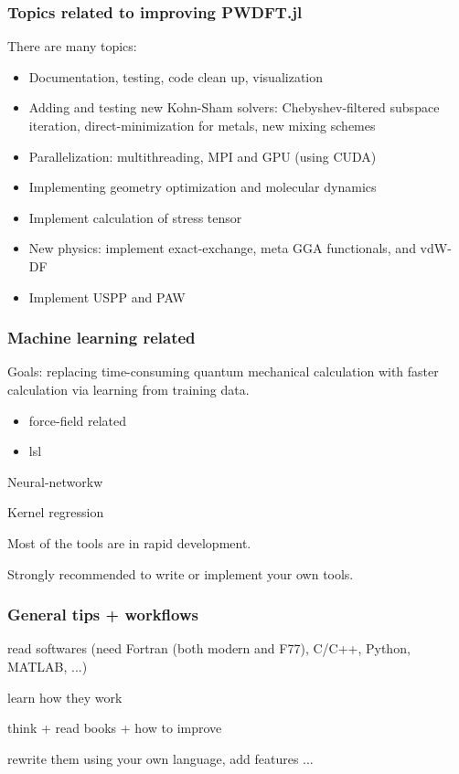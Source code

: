 \documentclass[english,9pt]{beamer}
\begin{document}
\begin{frame}
\frametitle{Topics related to improving PWDFT.jl}

There are many topics:

\begin{itemize}
\item Documentation, testing, code clean up, visualization
\item Adding and testing new Kohn-Sham solvers: Chebyshev-filtered
subspace iteration, direct-minimization for metals, new mixing schemes
\item Parallelization: multithreading, MPI and GPU (using CUDA)
\item Implementing geometry optimization and molecular dynamics
\item Implement calculation of stress tensor
\item New physics: implement exact-exchange, meta GGA functionals, and vdW-DF
\item Implement USPP and PAW
\end{itemize}


\end{frame}



\begin{frame}
\frametitle{Machine learning related}

Goals: replacing time-consuming quantum mechanical calculation with faster calculation
via learning from training data.

\begin{itemize}
\item force-field related
\item lsl
\end{itemize}

Neural-networkw

Kernel regression

Most of the tools are in rapid development.

Strongly recommended to write or implement your own tools.

\end{frame}


\begin{frame}
\frametitle{General tips + workflows}

read softwares (need Fortran (both modern and F77), C/C++, Python, MATLAB, ...)

learn how they work

think + read books + how to improve

rewrite them using your own language, add features ...

\end{frame}
\end{document}
